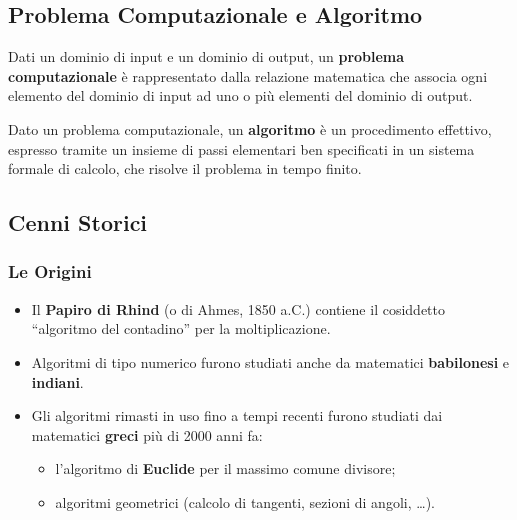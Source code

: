 \documentclass[12pt, a4paper]{article}
\begin{document}
\subsection{Problema Computazionale e Algoritmo}

\begin{tcolorbox}[colback=lightergray!10, colframe=tocsec, title=\textbf{Definizione: Problema Computazionale}]
\label{def:problema-computazionale}
Dati un dominio di input e un dominio di output, un \textbf{problema computazionale} è rappresentato dalla relazione matematica che associa ogni elemento del dominio di input ad uno o più elementi del dominio di output.
\end{tcolorbox}

\begin{tcolorbox}[colback=lightergray!10, colframe=tocsec, title=\textbf{Definizione: Algoritmo}]
\label{def:algoritmo}
Dato un problema computazionale, un \textbf{algoritmo} è un procedimento effettivo, espresso tramite un insieme di passi elementari ben specificati in un sistema formale di calcolo, che risolve il problema in tempo finito.
\end{tcolorbox}

\subsection{Cenni Storici}

\subsubsection{Le Origini}

\begin{itemize}
    \item Il \textbf{Papiro di Rhind} (o di Ahmes, 1850 a.C.) contiene il cosiddetto ``algoritmo del contadino'' per la moltiplicazione.
    \item Algoritmi di tipo numerico furono studiati anche da matematici \textbf{babilonesi} e \textbf{indiani}.
    \item Gli algoritmi rimasti in uso fino a tempi recenti furono studiati dai matematici \textbf{greci} più di 2000 anni fa:
    \begin{itemize}
        \item l'algoritmo di \textbf{Euclide} per il massimo comune divisore;
        \item algoritmi geometrici (calcolo di tangenti, sezioni di angoli, \dots).
    \end{itemize}
\end{itemize}
\end{document}
